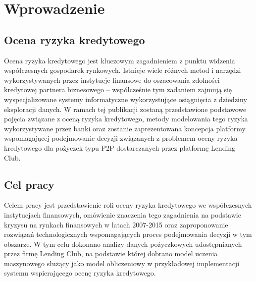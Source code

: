 ﻿\chapter{Wprowadzenie}

\section{Ocena ryzyka kredytowego}
Ocena ryzyka kredytowego jest kluczowym zagadnieniem z punktu widzenia współczesnych gospodarek rynkowych. Istnieje wiele różnych metod i narzędzi wykorzystywanych przez instytucje finansowe do oszacowania zdolności kredytowej partnera biznesowego – współcześnie tym zadaniem zajmują się wyspecjalizowane systemy informatyczne wykorzystujące osiągnięcia z dziedziny eksploracji danych. W ramach tej publikacji zostaną przedstawione podstawowe pojęcia związane z oceną ryzyka kredytowego, metody modelowania tego ryzyka wykorzystywane przez banki oraz zostanie zaprezentowana koncepcja platformy wspomagającej podejmowanie decyzji związanych z problemem oceny ryzyka kredytowego dla pożyczek typu P2P dostarczanych przez platformę Lending Club.

\section{Cel pracy}
Celem pracy jest przedstawienie roli oceny ryzyka kredytowego we współczesnych instytucjach finansowych, omówienie znaczenia tego zagadnienia na podstawie kryzysu na rynkach finansowych w latach 2007-2015 oraz zaproponowanie rozwiązań technologicznych wspomagających proces podejmowania decyzji w tym obszarze. W tym celu dokonano analizy danych pożyczkowych udostępnianych przez firmę Lending Club, na podstawie której dobrano model uczenia maszynowego służący jako model obliczeniowy w przykładowej implementacji systemu wspierającego ocenę ryzyka kredytowego.


